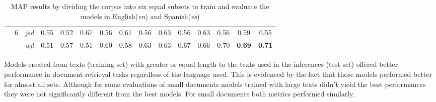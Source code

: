 \begin{table}[ht]
{{\begin{tabular}{ccccccccccccccc}
\multicolumn{1}{c|}{} & \multirow{2}{*}{6} & \multicolumn{1}{c|}{\textit{jsd}} & 0.55 & \multicolumn{1}{c|}{0.52} & 0.67 & \multicolumn{1}{c|}{0.56} & 0.61 & \multicolumn{1}{c|}{0.56} & 0.63 & \multicolumn{1}{c|}{0.56} & 0.63 & \multicolumn{1}{c|}{0.56} & \cellcolor{gray!25}0.59 & \multicolumn{1}{c|}{\cellcolor{gray!25}0.55} \\
\multicolumn{1}{c|}{} &  & \multicolumn{1}{c|}{\textit{wjl}} & 0.51 & \multicolumn{1}{c|}{0.57} & 0.51 & \multicolumn{1}{c|}{0.60} & 0.58 & \multicolumn{1}{c|}{0.63} & 0.63 & \multicolumn{1}{c|}{0.67} & 0.66 & \multicolumn{1}{c|}{0.70} & \cellcolor{gray!25}\textbf{0.69} & \multicolumn{1}{c|}{\cellcolor{gray!25}\textbf{0.71}} \\ \cline{2-15} 
\end{tabular}%
}}
 \vspace*{3mm}
\caption{MAP results by dividing the corpus into six equal subsets to train and evaluate the models in English(\textit{en}) and Spanish(\textit{es})} 
 \label{table:acquis6}
\end{table}


Models created from texts (training set) with greater or equal length to the texts used in the inferences (test set) offered better performance in document retrieval tasks regardless of the language used. This is evidenced by the fact that those models performed better for almost all sets. Although for some evaluations of small documents models trained with large texts didn't yield the best performances they were not significantly different from the best models. For small documents both metrics performed similarly. 

